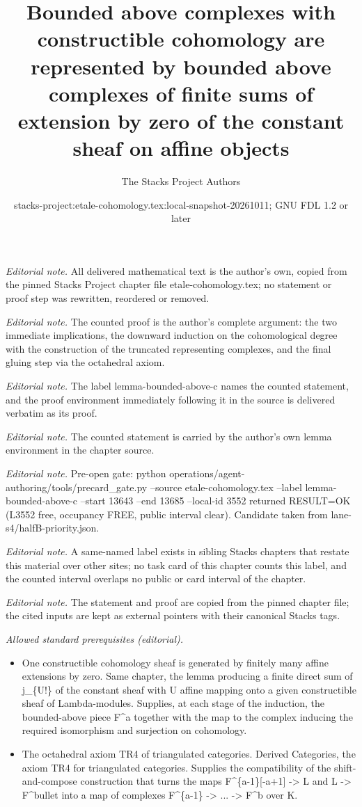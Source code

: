 \documentclass[10pt,a4paper]{amsart}
\title{Bounded above complexes with constructible cohomology are represented by bounded above complexes of finite sums of extension by zero of the constant sheaf on affine objects}
\author{The Stacks Project Authors}
\date{stacks-project:etale-cohomology.tex:local-snapshot-20261011; GNU FDL 1.2 or later}
\theoremstyle{plain}
\theoremstyle{definition}
\theoremstyle{remark}
\numberwithin{equation}{subsection}
\begin{document}
\maketitle
\noindent\textit{Editorial note.} All delivered mathematical text is the author's own, copied from the pinned Stacks Project chapter file etale-cohomology.tex; no statement or proof step was rewritten, reordered or removed.\par\medskip
\noindent\textit{Editorial note.} The counted proof is the author's complete argument: the two immediate implications, the downward induction on the cohomological degree with the construction of the truncated representing complexes, and the final gluing step via the octahedral axiom.\par\medskip
\noindent\textit{Editorial note.} The label lemma-bounded-above-c names the counted statement, and the proof environment immediately following it in the source is delivered verbatim as its proof.\par\medskip
\noindent\textit{Editorial note.} The counted statement is carried by the author's own lemma environment in the chapter source.\par\medskip
\noindent\textit{Editorial note.} Pre-open gate: python operations/agent-authoring/tools/precard\_gate.py --source etale-cohomology.tex --label lemma-bounded-above-c --start 13643 --end 13685 --local-id 3552 returned RESULT=OK (L3552 free, occupancy FREE, public interval clear). Candidate taken from lane-s4/halfB-priority.json.\par\medskip
\noindent\textit{Editorial note.} A same-named label exists in sibling Stacks chapters that restate this material over other sites; no task card of this chapter counts this label, and the counted interval overlaps no public or card interval of the chapter.\par\medskip
\noindent\textit{Editorial note.} The statement and proof are copied from the pinned chapter file; the cited inputs are kept as external pointers with their canonical Stacks tags.\par\medskip
\noindent\textit{Allowed standard prerequisites (editorial).}\begin{itemize}
\item One constructible cohomology sheaf is generated by finitely many affine extensions by zero. Same chapter, the lemma producing a finite direct sum of j\_\{U!\} of the constant sheaf with U affine mapping onto a given constructible sheaf of Lambda-modules. Supplies, at each stage of the induction, the bounded-above piece F\textasciicircum{}a together with the map to the complex inducing the required isomorphism and surjection on cohomology.
\item The octahedral axiom TR4 of triangulated categories. Derived Categories, the axiom TR4 for triangulated categories. Supplies the compatibility of the shift-and-compose construction that turns the maps F\textasciicircum{}\{a-1\}[-a+1] -> L and L -> F\textasciicircum{}bullet into a map of complexes F\textasciicircum{}\{a-1\} -> ... -> F\textasciicircum{}b over K.
\end{itemize}\medskip
\end{document}
